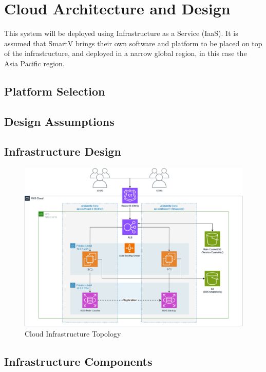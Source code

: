 \section{Cloud Architecture and Design}

This system will be deployed using Infrastructure as a Service (IaaS). It is assumed that SmartV brings their own software and platform to be placed on top of the infrastructure, and deployed in a narrow global region, in this case the Asia Pacific region.

\subsection{Platform Selection}



\subsection{Design Assumptions}

\subsection{Infrastructure Design}
\begin{figure}[H]\label{fig:awsdiagram}
    \centering
    \includegraphics[width=\textwidth]{cci_aws}
    \caption{Cloud Infrastructure Topology}
\end{figure}

\subsection{Infrastructure Components}

